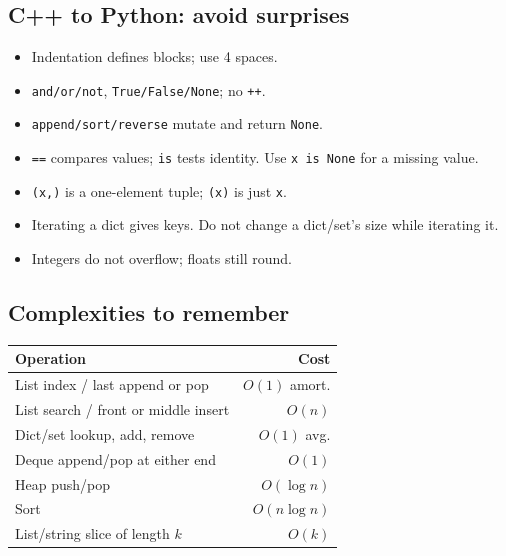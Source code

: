 \subsection{C++ to Python: avoid surprises}
\begin{itemize}
\item Indentation defines blocks; use 4 spaces.
\item \texttt{and/or/not}, \texttt{True/False/None}; no \texttt{++}.
\item \texttt{append/sort/reverse} mutate and return \texttt{None}.
\item \texttt{==} compares values; \texttt{is} tests identity.
      Use \texttt{x is None} for a missing value.
\item \texttt{(x,)} is a one-element tuple; \texttt{(x)} is just \texttt{x}.
\item Iterating a dict gives keys. Do not change a dict/set's size
      while iterating it.
\item Integers do not overflow; floats still round.
\end{itemize}

\subsection{Complexities to remember}\label{py:complexities}
\small
\begin{tabularx}{\linewidth}{@{}Xr@{}}
\toprule
Operation & Cost\\
\midrule
List index / last append or pop & $O(1)$ amort.\\
List search / front or middle insert & $O(n)$\\
Dict/set lookup, add, remove & $O(1)$ avg.\\
Deque append/pop at either end & $O(1)$\\
Heap push/pop & $O(\log n)$\\
Sort & $O(n\log n)$\\
List/string slice of length $k$ & $O(k)$\\
\bottomrule
\end{tabularx}
\normalsize
{}
